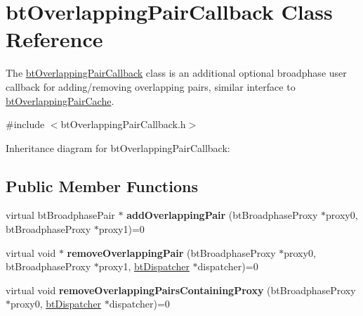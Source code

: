 \hypertarget{classbt_overlapping_pair_callback}{\section{bt\+Overlapping\+Pair\+Callback Class Reference}
\label{classbt_overlapping_pair_callback}
}


The \hyperlink{classbt_overlapping_pair_callback}{bt\+Overlapping\+Pair\+Callback} class is an additional optional broadphase user callback for adding/removing overlapping pairs, similar interface to \hyperlink{classbt_overlapping_pair_cache}{bt\+Overlapping\+Pair\+Cache}.  




{\ttfamily \#include $<$bt\+Overlapping\+Pair\+Callback.\+h$>$}



Inheritance diagram for bt\+Overlapping\+Pair\+Callback\+:
\subsection*{Public Member Functions}
\begin{DoxyCompactItemize}
\item 
\hypertarget{classbt_overlapping_pair_callback_af9812526d52b41a8d91c5dc9d73f39f1}{virtual bt\+Broadphase\+Pair $\ast$ {\bfseries add\+Overlapping\+Pair} (bt\+Broadphase\+Proxy $\ast$proxy0, bt\+Broadphase\+Proxy $\ast$proxy1)=0}\label{classbt_overlapping_pair_callback_af9812526d52b41a8d91c5dc9d73f39f1}

\item 
\hypertarget{classbt_overlapping_pair_callback_aca7cc587fa69c4471af85afe8dc0aef9}{virtual void $\ast$ {\bfseries remove\+Overlapping\+Pair} (bt\+Broadphase\+Proxy $\ast$proxy0, bt\+Broadphase\+Proxy $\ast$proxy1, \hyperlink{classbt_dispatcher}{bt\+Dispatcher} $\ast$dispatcher)=0}\label{classbt_overlapping_pair_callback_aca7cc587fa69c4471af85afe8dc0aef9}

\item 
\hypertarget{classbt_overlapping_pair_callback_ac6bd83bc84c9db75b194096b4f4abb82}{virtual void {\bfseries remove\+Overlapping\+Pairs\+Containing\+Proxy} (bt\+Broadphase\+Proxy $\ast$proxy0, \hyperlink{classbt_dispatcher}{bt\+Dispatcher} $\ast$dispatcher)=0}\label{classbt_overlapping_pair_callback_ac6bd83bc84c9db75b194096b4f4abb82}

\end{DoxyCompactItemize}


